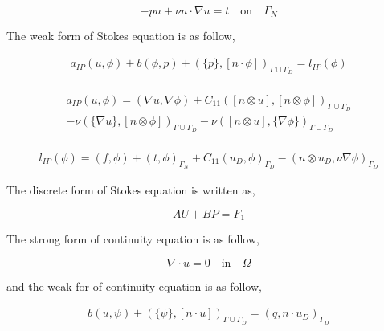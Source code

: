 \documentclass[a4paper,12pt]{book}
\begin{document}
\begin{equation} \label{neumann condition stokes}
-pn + \nu n \cdot \nabla u = t \quad \textrm{on} \quad \Gamma_N
\end{equation}

The weak form of Stokes equation is as follow,

\begin{equation}\label{stokes_weak}
\begin{split}
a_{IP}(u,\phi) + b(\phi,p) + (\{p\},[n\cdot \phi])_{\Gamma \cup \Gamma_D} = l_{IP}(\phi) 
\end{split}
\end{equation}
\\
\begin{equation}
\begin{split}
a_{IP}(u,\phi) = (\nabla u, \nabla \phi) + C_{11} ([n \otimes u],[n \otimes \phi])_{\Gamma \cup \Gamma_D} \\
- \nu (\{\nabla u\},[n \otimes \phi])_{\Gamma \cup \Gamma_D} - \nu ([n \otimes u],\{\nabla \phi\})_{\Gamma \cup \Gamma_D}
\end{split}
\end{equation}
\\
\begin{equation}
\begin{split}
l_{IP}(\phi) = (f,\phi) + (t,\phi)_{\Gamma_N} + C_{11} (u_D,\phi)_{\Gamma_D} - (n \otimes u_D, \nu \nabla \phi)_{\Gamma_D}
\end{split}
\end{equation}

The discrete form of Stokes equation is written as,

\begin{equation} \label{stokes discrete}
AU + BP = F_1
\end{equation}

The strong form of continuity equation is as follow,

\begin{equation}
\nabla \cdot u = 0 \quad \textrm{in} \quad \Omega
\end{equation}

and the weak for of continuity equation is as follow,

\begin{equation}\label{contiuity_weak}
\begin{split}
b(u,\psi) + (\{\psi\},[n\cdot u])_{\Gamma \cup \Gamma_D} = (q,n\cdot u_D)_{\Gamma_D} 
\end{split}
\end{equation}
\end{document}
